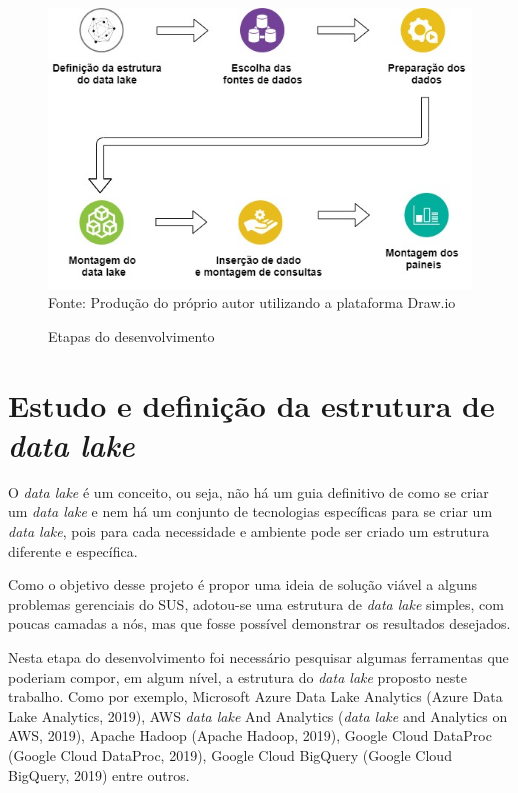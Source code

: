 \documentclass[
	12pt,				%
	openright,			%
	oneside,			%
	a4paper,			%
	chapter=TITLE,		%
	section=TITLE,		%
	subsection=TITLE,	%
	subsubsection=TITLE,%
	english,			%
	brazil				%
	]{abntex2}
\theoremstyle{definition}
\begin{document}
    \begin{figure}[H]
         \centering
         \caption{Etapas do desenvolvimento}
         \includegraphics[scale=0.6]{imagens/etapas-tcc.jpg}
         \\{\footnotesize Fonte: Produção do próprio autor utilizando a plataforma Draw.io}
         \label{etapas tcc}
    \end{figure}
    
\section{Estudo e definição da estrutura de \textit{data lake}}

    O \textit{data lake} é um conceito, ou seja, não há um guia definitivo de como se criar um \textit{data lake} e nem há um conjunto de tecnologias específicas para se criar um \textit{data lake}, pois para cada necessidade e ambiente pode ser criado um estrutura diferente e específica. 
    
    Como o objetivo desse projeto é propor uma ideia de solução viável a alguns problemas gerenciais do SUS, adotou-se uma estrutura de \textit{data lake} simples, com poucas camadas a nós, mas que fosse possível demonstrar os resultados desejados. 
    
    Nesta etapa do desenvolvimento foi necessário pesquisar algumas ferramentas que poderiam compor, em algum nível, a estrutura do \textit{data lake} proposto neste trabalho. Como por exemplo, Microsoft Azure Data Lake Analytics (Azure Data Lake Analytics, 2019), AWS \textit{data lake} And Analytics (\textit{data lake} and Analytics on AWS, 2019), Apache Hadoop (Apache Hadoop, 2019), Google Cloud DataProc (Google Cloud DataProc, 2019), Google Cloud BigQuery (Google Cloud BigQuery, 2019) entre outros. 
    
\end{document}
